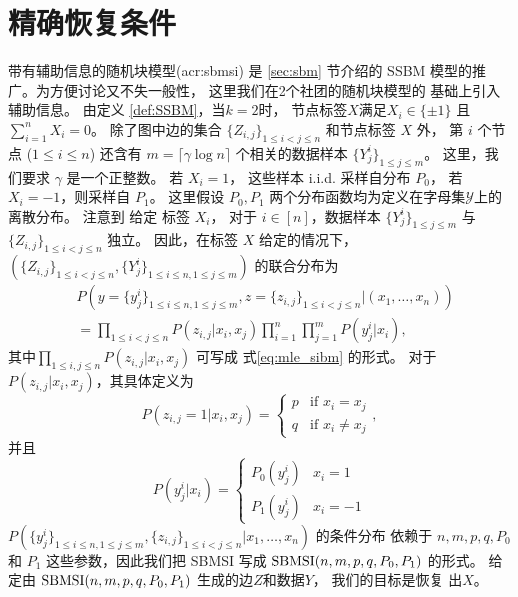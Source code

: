 \section{精确恢复条件}\label{sec:sbmsi_exact_recovery_condition}
带有辅助信息的随机块模型(\gls{acr:sbmsi})
是 \ref{sec:sbm} 节介绍的
SSBM 模型的推广。为方便讨论又不失一般性，
这里我们在2个社团的随机块模型的
基础上引入辅助信息。
由定义 \ref{def:SSBM}，当$k=2$时，
节点标签$X$满足$X_i \in \{\pm 1\}$
且 $\sum_{i=1}^n X_i = 0$。
除了图中边的集合
$\{Z_{i,j}\}_{1\le i<j\le n}$
和节点标签 $X$ 外，
第 $i$  个节点 ($1\leq i \leq n$) 
还含有 $m=\lceil \gamma \log n \rceil $ 个相关的数据样本 
$\{Y^{i}_j\}_{1\leq j \leq m}$。
这里，我们要求 $\gamma$ 是一个正整数。
若 $X_i=1$，
这些样本 i.i.d. 采样自分布 $P_0$，
若 $X_i=-1$，则采样自 $P_1$。
这里假设 $P_0, P_1$ 两个分布函数均为定义在字母集$\mathcal{Y}$上的离散分布。
注意到 给定 标签 $X_i$，
对于 $i\in [n]$，数据样本 $\{Y^{i}_j\}_{1\leq j \leq m}$ 与 $\{Z_{i,j}\}_{1\le i<j\le n}$ 独立。
 因此，在标签 $X$ 给定的情况下，
  $(\{Z_{i,j}\}_{1\le i<j\le n},\{Y^i_{j}\}_{1\le i\le n,1\le j\le m})$ 的联合分布为  
\begin{align}\label{eq:lh}
    &P(y=\{y^i_{j}\}_{1\le i\le n,1\le j\le m},z=\{z_{i,j}\}_{1\le i<j\le n}| (x_1,\ldots,x_n)) \nonumber\\
    &= \prod_{1\le i < j\le n}P(z_{i,j}|x_i,x_j)\prod_{i=1}^n \prod_{j=1}^m P(y^i_j|x_i), 
\end{align}
其中$\prod_{1\le i,j\le n}P(z_{i,j}|x_i,x_j)$ 可写成
式\eqref{eq:mle_sibm} 的形式。
对于$P(z_{i,j}|x_i,x_j)$，其具体定义为
\begin{equation*}
    P  (z_{i,j}=1|x_i,x_j) = \begin{cases}
        p & \text{if } x_i = x_j \\
        q & \text{if } x_i\ne x_j
    \end{cases},
\end{equation*}
并且
\begin{equation*}
    P(y^i_j|x_i) = \begin{cases}
        P_0(y^i_j) & x_i = 1 \\
        P_1(y^i_j) & x_i = -1
    \end{cases}
\end{equation*}
 $P(\{y^i_{j}\}_{1\le i\le n,1\le j\le m},\{z_{i,j}\}_{1\le i<j\le n}| x_1,\ldots,x_n)$ 
 的条件分布 依赖于
 $n,m,p, q, P_0$ 和 $P_1$ 这些参数，因此我们把 SBMSI 写成 $\operatorname{SBMSI}(n,m,p,q,P_0,P_1)$ 的形式。
 给定由 $\operatorname{SBMSI}(n,m,p,q,P_0,P_1)$ 生成的边$Z$和数据$Y$， 我们的目标是恢复 出$X$。
 
